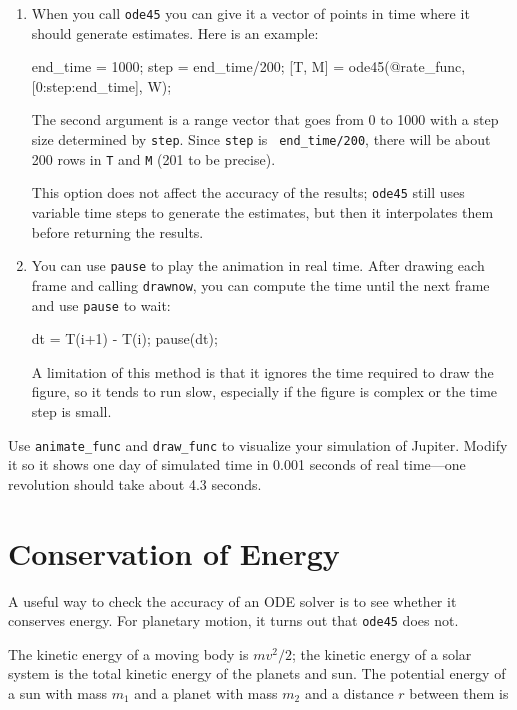 \documentclass[
]{book}
\numberwithin{Answer}{chapter}
\numberwithin{Exercise}{chapter}
\begin{document}
\begin{enumerate}

\item When you call {\tt ode45} you can give it a vector of
points in time where it should generate estimates.  Here is
an example:

\begin{code}
end_time = 1000;
step = end_time/200;
[T, M] = ode45(@rate_func, [0:step:end_time], W);
\end{code}

The second argument is a range vector that goes from 0 to 1000 with a
step size determined by {\tt step}.  Since {\tt step} is {\tt
end\_time/200}, there will be about 200 rows in {\tt T} and {\tt M}
(201 to be precise).

This option does not affect the accuracy of the results; {\tt ode45}
still uses variable time steps to generate the estimates, but then it
interpolates them before returning the results.

\item You can use {\tt pause} to play the animation in
real time.  After drawing each frame and calling
{\tt drawnow}, you can compute the time
until the next frame and use {\tt pause} to wait:

\begin{code}
dt = T(i+1) - T(i);
pause(dt);
\end{code}

A limitation of this method is that it ignores the time required to
draw the figure, so it tends to run slow, especially if the figure is
complex or the time step is small.

\end{enumerate}

\begin{ex}
Use {\tt animate\_func} and {\tt draw\_func} to visualize your
simulation of Jupiter.  Modify it so it shows one day of simulated
time in 0.001 seconds of real time---one revolution should take
about 4.3 seconds.
\end{ex}


\section{Conservation of Energy}

A useful way to check the accuracy of an ODE solver is to
see whether it conserves energy.  For planetary
motion, it turns out that {\tt ode45} does not.

The kinetic energy of a moving body is $m v^2 / 2$; the
kinetic energy of a solar system is the total kinetic
energy of the planets and sun.
The potential energy of a sun with mass $m_1$ and a
planet with mass $m_2$ and a distance $r$ between them is
\end{document}

